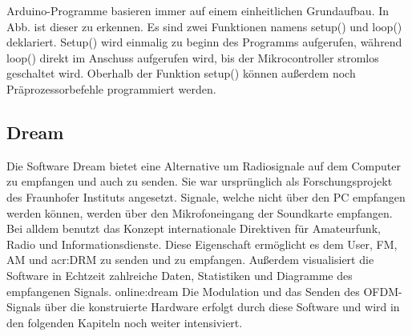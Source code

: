 Arduino-Programme basieren immer auf einem einheitlichen Grundaufbau. In Abb. ist
dieser zu erkennen. Es sind zwei Funktionen namens setup() und loop() deklariert.
Setup() wird einmalig zu beginn des Programms aufgerufen, während loop() direkt im Anschuss aufgerufen wird, bis der Mikrocontroller stromlos geschaltet wird. Oberhalb der Funktion setup() können außerdem noch Präprozessorbefehle programmiert werden.

\subsection{Dream}
\label{subsec:dreamsoft}
Die Software Dream bietet eine Alternative um Radiosignale auf dem Computer zu empfangen und auch zu senden. Sie war ursprünglich als Forschungsprojekt des Fraunhofer Instituts angesetzt. Signale, welche nicht über den PC empfangen werden können, werden über den Mikrofoneingang der Soundkarte empfangen.
Bei alldem benutzt das Konzept internationale Direktiven für Amateurfunk, Radio und Informationsdienste.
Diese Eigenschaft ermöglicht es dem User, FM, AM und \gls{acr:DRM} zu senden und zu empfangen. Außerdem visualisiert die Software in Echtzeit zahlreiche Daten, Statistiken und Diagramme des empfangenen Signals. \gls{online:dream} Die Modulation und das Senden des OFDM-Signals über die konstruierte Hardware erfolgt durch diese Software und wird in den folgenden Kapiteln noch weiter intensiviert.